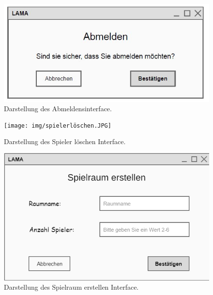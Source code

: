 \begin{figure}[h]
	\centering
	\includegraphics[width=\textwidth]{img/spielerabmelden.JPG}
	\caption{Darstellung des Abmeldensinterface.}
	\label{gui:abmelden} %
\end{figure}

\begin{figure}[h]
	\centering
	\texttt{[image: img/spielerlöschen.JPG]}
	\caption{Darstellung des Spieler löschen Interface.}
	\label{gui:splöschen} %
\end{figure}

\begin{figure}[h]
	\centering
	\includegraphics[width=\textwidth]{img/srerstellen.png}
	\caption{Darstellung des Spielraum erstellen Interface.}
	\label{gui:erstellen} %
\end{figure}

